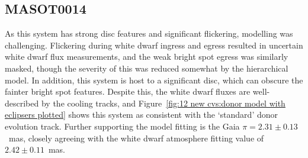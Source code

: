 \newpage
\subsection{MASOT0014}

As this system has strong disc features and significant flickering, modelling was challenging. Flickering during white dwarf ingress and egress resulted in uncertain white dwarf flux measurements, and the weak bright spot egress was similarly masked, though the severity of this was reduced somewhat by the hierarchical model. In addition, this system is host to a significant disc, which can obscure the fainter bright spot features.
Despite this, the white dwarf fluxes are well-described by the cooling tracks, and Figure~\ref{fig:12 new cvs:donor model with eclipsers plotted} shows this system as consistent with the `standard' donor evolution track.
Further supporting the model fitting is the Gaia $\pi = 2.31 \pm 0.13$~mas, closely agreeing with the white dwarf atmosphere fitting value of $2.42\pm0.11$~mas.

%     

